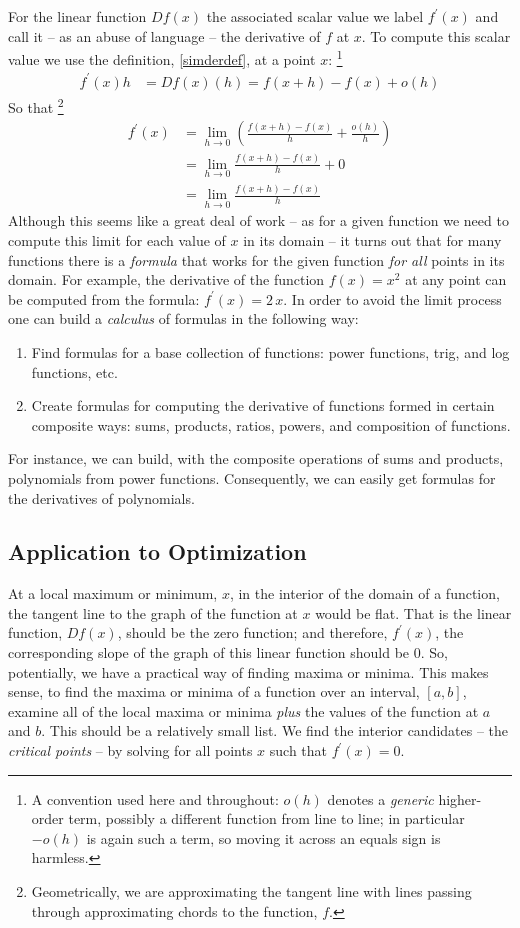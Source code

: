 \documentclass{article}
\begin{document}
For the linear function $Df(x)$ the associated scalar value we label $f^\prime(x)$
and call it -- as an abuse of language -- the derivative of $f$ at $x$.
To compute this scalar value we use the definition, \eqref{simderdef}, at a point $x$:%
\footnote{A convention used here and throughout: $o(h)$ denotes a
{\em generic\/} higher-order term, possibly a different function from line
to line; in particular $-o(h)$ is again such a term, so moving it across an
equals sign is harmless.}
\begin{align}
  f^\prime(x) h &= Df(x)(h) = f(x+h) - f(x) + o(h)
\end{align}
So that%
\footnote{Geometrically, we are approximating the tangent line with lines passing
through approximating chords to the function, $f$.}
\begin{align}
  f^\prime(x) &= \lim_{h \rightarrow 0} \left( \frac{f(x+h) - f(x)}{h} + \frac{o(h)}{h} \right) \nonumber \\
  &= \lim_{h \rightarrow 0} \frac{f(x+h) - f(x)}{h} + 0 \nonumber \\
  &= \lim_{h \rightarrow 0} \frac{f(x+h) - f(x)}{h}
\end{align}
Although this seems like a great deal of work -- as for a given function we need to
compute this limit for each value of $x$ in its domain -- it turns out that for
many functions there is a {\em formula\/} that works for the given function
{\em for all\/}
points in its domain. For example, the derivative of the
function $f(x) = x^2$ at any point can be computed from the formula:
$f^\prime(x) = 2\, x$. In order to avoid the limit process one can build a
{\em calculus\/} of formulas in the following way:
\begin{enumerate}
\item Find formulas for a base collection of functions: power functions, trig, and log
functions, etc.
\item Create formulas for computing the derivative of functions formed in certain
composite ways: sums, products, ratios, powers, and composition of functions.
\end{enumerate}
For instance, we can build, with the composite operations of sums and products,
polynomials from power functions. Consequently, we can easily get formulas 
for the derivatives of polynomials.

\subsection{Application to Optimization}
At a local maximum or minimum, $x$, in the interior of the domain of a
function, the tangent line to
the graph of the function at $x$ would be flat. That is the linear function, $Df(x)$,
should be the zero function; and therefore, $f^\prime(x)$, the corresponding
slope of the graph of this linear function should be $0$.
So, potentially, we have a practical way of finding maxima or minima.
This makes sense, to find the maxima or minima of a function over an interval, $[a,b]$,
examine all of the local maxima or minima {\em plus\/} the values of the function
at $a$ and $b$. This should be a relatively small list. We find the interior
candidates -- the {\em critical points\/} -- by solving for all points $x$
such that $f^\prime(x) = 0$.
\end{document}
